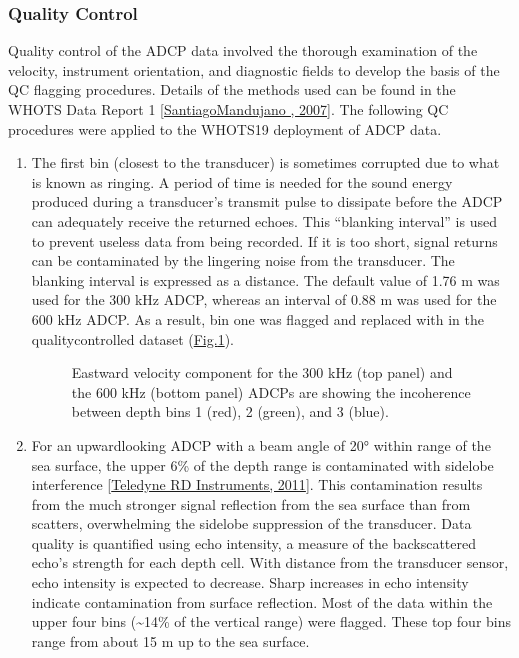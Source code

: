 \documentclass[a4paper,10pt,english,openany,oneside]{sphinxmanual}
\let\sphinxpxdimen\pdfpxdimen\else\newdimen\sphinxpxdimen
\begin{document}
\subsubsection{Quality Control}
\label{\detokenize{5_section:quality-control}}
\sphinxAtStartPar
Quality control of the ADCP data involved the thorough examination of the
velocity, instrument orientation, and diagnostic fields to develop the basis of
the QC flagging procedures. Details of the methods used can be found in the
WHOTS Data Report 1 {[}\hyperlink{cite.references:id15}{Santiago\sphinxhyphen{}Mandujano , 2007}{]}. The following QC
procedures were applied to the WHOTS\sphinxhyphen{}19 deployment of ADCP data.
\begin{enumerate}
%
\item {} 
\sphinxAtStartPar
The first bin (closest to the transducer) is sometimes corrupted due to what
is known as ringing. A period of time is needed for the sound energy
produced during a transducer’s transmit pulse to dissipate before the ADCP
can adequately receive the returned echoes. This “blanking interval” is used
to prevent useless data from being recorded. If it is too short, signal
returns can be contaminated by the lingering noise from the transducer. The
blanking interval is expressed as a distance. The default value of 1.76 m
was used for the 300 kHz ADCP, whereas an interval of 0.88 m was used for
the 600 kHz ADCP. As a result, bin one was flagged and replaced with  in the quality\sphinxhyphen{}controlled dataset (\hyperref[\detokenize{5_section:figure5-21}]{Fig.\@ \ref{\detokenize{5_section:figure5-21}}}).

\begin{figure}[htbp]
\centering
\capstart

\noindent\sphinxincludegraphics[height=600\sphinxpxdimen]{{wh19_ringing}.png}
\caption{Eastward velocity component for the 300 kHz (top panel) and the 600 kHz (bottom
panel) ADCPs are showing the incoherence between depth bins 1 (red), 2 (green),
and 3 (blue).}\label{\detokenize{5_section:figure5-21}}\end{figure}

\item {} 
\sphinxAtStartPar
For an upward\sphinxhyphen{}looking ADCP with a beam angle of 20° within range of the sea
surface, the upper 6\% of the depth range is contaminated with sidelobe
interference {[}\hyperlink{cite.references:id27}{Teledyne RD Instruments, 2011}{]}. This contamination results
from the much stronger signal reflection from the sea surface than from
scatters, overwhelming the sidelobe suppression of the transducer. Data
quality is quantified using echo intensity, a measure of the backscattered
echo’s strength for each depth cell. With distance from the transducer
sensor, echo intensity is expected to decrease. Sharp increases in echo
intensity indicate contamination from surface reflection. Most of the data
within the upper four bins (\textasciitilde{}14\% of the vertical range) were flagged. These
top four bins range from about 15 m up to the sea surface.


\end{enumerate}
\end{document}

